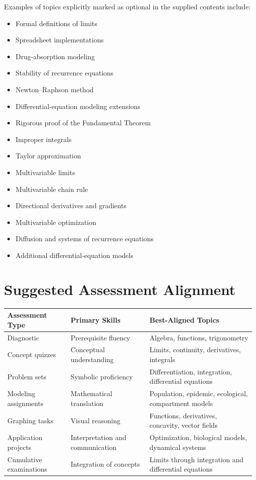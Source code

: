 \documentclass[11pt]{article}
\begin{document}
Examples of topics explicitly marked as optional in the supplied
contents include:

\begin{itemize}
    \item Formal definitions of limits
    \item Spreadsheet implementations
    \item Drug-absorption modeling
    \item Stability of recurrence equations
    \item Newton--Raphson method
    \item Differential-equation modeling extensions
    \item Rigorous proof of the Fundamental Theorem
    \item Improper integrals
    \item Taylor approximation
    \item Multivariable limits
    \item Multivariable chain rule
    \item Directional derivatives and gradients
    \item Multivariable optimization
    \item Diffusion and systems of recurrence equations
    \item Additional differential-equation models
\end{itemize}


\section{Suggested Assessment Alignment}

\begin{longtable}{p{} p{} p{}}
\toprule
\textbf{Assessment Type} & \textbf{Primary Skills} & \textbf{Best-Aligned Topics}\\
\midrule
Diagnostic &
Prerequisite fluency &
Algebra, functions, trigonometry\\
\addlinespace
Concept quizzes &
Conceptual understanding &
Limits, continuity, derivatives, integrals\\
\addlinespace
Problem sets &
Symbolic proficiency &
Differentiation, integration, differential equations\\
\addlinespace
Modeling assignments &
Mathematical translation &
Population, epidemic, ecological, compartment models\\
\addlinespace
Graphing tasks &
Visual reasoning &
Functions, derivatives, concavity, vector fields\\
\addlinespace
Application projects &
Interpretation and communication &
Optimization, biological models, dynamical systems\\
\addlinespace
Cumulative examinations &
Integration of concepts &
Limits through integration and differential equations\\
\bottomrule
\end{longtable}
\end{document}
